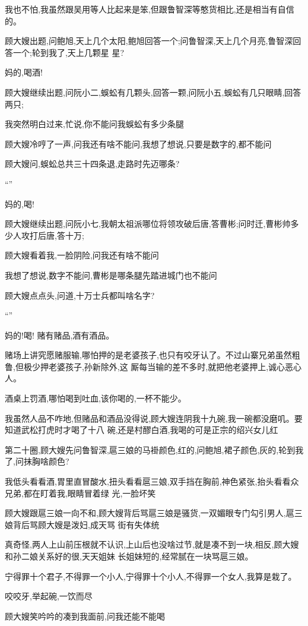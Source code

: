 ﻿\documentclass[12pt]{article}
\begin{document}
我也不怕,我虽然跟吴用等人比起来是笨,但跟鲁智深等憨货相比,还是相当有自信的。

顾大嫂出题,问鲍旭,天上几个太阳,鲍旭回答一个;问鲁智深,天上几个月亮,鲁智深回答一个;轮到我了,天上几颗星
星?

妈的,喝酒!

顾大嫂继续出题,问阮小二,蜈蚣有几颗头,回答一颗,问阮小五,蜈蚣有几只眼睛,回答两只;

我突然明白过来,忙说,你不能问我蜈蚣有多少条腿

顾大嫂冷哼了一声,问我还有啥不能问,我想了想说,只要是数字的,都不能问

顾大嫂问,蜈蚣总共三十四条退,走路时先迈哪条?

``\dldots ''

妈的,喝!

顾大嫂继续出题,问阮小七,我朝太祖派哪位将领攻破后唐,答曹彬;问时迁,曹彬帅多少人攻打后唐,答十万;

顾大嫂看着我,一脸阴险,问我还有啥不能问

我想了想说,数字不能问,曹彬是哪条腿先踏进城门也不能问

顾大嫂点点头,问道,十万士兵都叫啥名字?

``\dldots ''

妈的!喝! 赌有赌品,酒有酒品。

赌场上讲究愿赌服输,哪怕押的是老婆孩子,也只有咬牙认了。不过山寨兄弟虽然粗鲁,但极少押老婆孩子,孙新除外,这
厮每当输的差不多时,就把他老婆押上,诚心恶心人。

酒桌上罚酒,哪怕喝到吐血,该你喝的,一杯不能少。

我虽然人品不咋地,但赌品和酒品没得说,顾大嫂连阴我十九碗,我一碗都没磨叽。要知道武松打虎时才喝了十八
碗,还是村醪白酒,我喝的可是正宗的绍兴女儿红

第二十圈,顾大嫂先问鲁智深,扈三娘的马褂颜色,红的,问鲍旭,裙子颜色,灰的,轮到我了,问抹胸啥颜色?

我低头看看酒,胃里直冒酸水,扭头看看扈三娘,双手挡在胸前,神色紧张,抬头看看众兄弟,都在盯着我,眼睛冒着绿
光,一脸坏笑

顾大嫂跟扈三娘一向不和,顾大嫂背后骂扈三娘是骚货,一双媚眼专门勾引男人,扈三娘背后骂顾大嫂是泼妇,成天骂
街有失体统\dldots

真奇怪,两人上山前压根就不认识,上山后也没啥过节,就是凑不到一块,相反,顾大嫂和孙二娘关系好的很,天天姐妹
长姐妹短的,经常腻在一块骂扈三娘。

宁得罪十个君子,不得罪一个小人,宁得罪十个小人,不得罪一个女人,我算是栽了。

咬咬牙,举起碗,一饮而尽

顾大嫂笑吟吟的凑到我面前,问我还能不能喝
\end{document}
